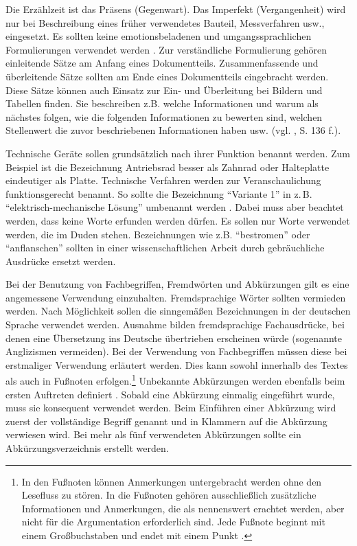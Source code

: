 \noindent
Die Erzählzeit ist das Präsens (Gegenwart).
Das Imperfekt (Vergangenheit) wird nur bei Beschreibung eines früher verwendetes Bauteil, Messverfahren usw., eingesetzt.
Es sollten keine emotionsbeladenen und umgangssprachlichen Formulierungen verwendet werden \cite[S.~131]{Hering2009}.
Zur verständliche Formulierung gehören einleitende Sätze am Anfang eines Dokumentteils.
Zusammenfassende und überleitende Sätze sollten am Ende eines Dokumentteils eingebracht werden.
Diese Sätze können auch Einsatz zur Ein- und Überleitung bei Bildern und Tabellen finden.
Sie beschreiben z.B. welche Informationen und warum als nächstes folgen, wie die folgenden Informationen zu bewerten sind, welchen Stellenwert die zuvor beschriebenen Informationen haben usw. (vgl. \cite{Hering2009}, S. 136 f.).

Technische Geräte sollen grundsätzlich nach ihrer Funktion benannt werden.
Zum Beispiel ist die Bezeichnung Antriebsrad besser als Zahnrad oder Halteplatte eindeutiger als Platte.
Technische Verfahren werden zur Veranschaulichung funktionsgerecht benannt.
So sollte die Bezeichnung "`Variante 1"' in z.\,B. "`elektrisch-mechanische Lösung"' umbenannt werden \cite[S.~131]{Hering2009}.
Dabei muss aber beachtet werden, dass keine Worte erfunden werden dürfen.
Es sollen nur Worte verwendet werden, die im Duden stehen.
Bezeichnungen wie z.B. "`bestromen"' oder "`anflanschen"' sollten in einer wissenschaftlichen Arbeit durch gebräuchliche Ausdrücke ersetzt werden.

Bei der Benutzung von Fachbegriffen, Fremdwörten und Abkürzungen gilt es eine angemessene Verwendung einzuhalten.
Fremdsprachige Wörter sollten vermieden werden.
Nach Möglichkeit sollen die sinngemäßen Bezeichnungen in der deutschen Sprache verwendet werden.
Ausnahme bilden fremdsprachige Fachausdrücke, bei denen eine Übersetzung ins Deutsche übertrieben erscheinen würde (sogenannte Anglizismen vermeiden).
Bei der Verwendung von Fachbegriffen müssen diese bei erstmaliger Verwendung erläutert werden.
Dies kann sowohl innerhalb des Textes als auch in Fußnoten erfolgen.\footnote{In den Fußnoten können Anmerkungen untergebracht werden ohne den Lesefluss zu stören.
In die Fußnoten gehören ausschließlich zusätzliche Informationen und Anmerkungen, die als nennenswert erachtet werden, aber nicht für die Argumentation erforderlich sind. Jede Fußnote beginnt mit einem Großbuchstaben und endet mit einem Punkt \cite[S.~197~f.]{Balz2008}.}
Unbekannte Abkürzungen werden ebenfalls beim ersten Auftreten definiert \cite[S.~136]{Balz2008}.
Sobald eine Abkürzung einmalig eingeführt wurde, muss sie konsequent verwendet werden.
Beim Einführen einer Abkürzung wird zuerst der vollständige Begriff genannt und in Klammern auf die Abkürzung verwiesen wird.
Bei mehr als fünf verwendeten Abkürzungen sollte ein Abkürzungsverzeichnis erstellt werden.

